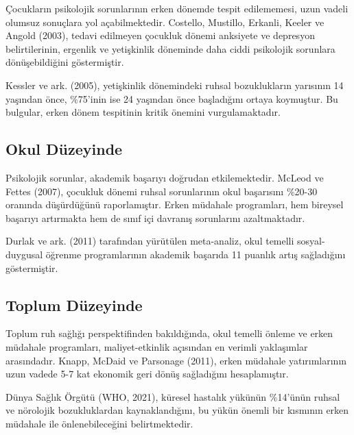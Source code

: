 Çocukların psikolojik sorunlarının erken dönemde tespit edilememesi, uzun vadeli olumsuz sonuçlara yol açabilmektedir. Costello, Mustillo, Erkanli, Keeler ve Angold (2003), tedavi edilmeyen çocukluk dönemi anksiyete ve depresyon belirtilerinin, ergenlik ve yetişkinlik döneminde daha ciddi psikolojik sorunlara dönüşebildiğini göstermiştir.

Kessler ve ark. (2005), yetişkinlik dönemindeki ruhsal bozuklukların yarısının 14 yaşından önce, \%75'inin ise 24 yaşından önce başladığını ortaya koymuştur. Bu bulgular, erken dönem tespitinin kritik önemini vurgulamaktadır.

\subsection{Okul Düzeyinde}

Psikolojik sorunlar, akademik başarıyı doğrudan etkilemektedir. McLeod ve Fettes (2007), çocukluk dönemi ruhsal sorunlarının okul başarısını \%20-30 oranında düşürdüğünü raporlamıştır. Erken müdahale programları, hem bireysel başarıyı artırmakta hem de sınıf içi davranış sorunlarını azaltmaktadır.

Durlak ve ark. (2011) tarafından yürütülen meta-analiz, okul temelli sosyal-duygusal öğrenme programlarının akademik başarıda 11 puanlık artış sağladığını göstermiştir.

\subsection{Toplum Düzeyinde}

Toplum ruh sağlığı perspektifinden bakıldığında, okul temelli önleme ve erken müdahale programları, maliyet-etkinlik açısından en verimli yaklaşımlar arasındadır. Knapp, McDaid ve Parsonage (2011), erken müdahale yatırımlarının uzun vadede 5-7 kat ekonomik geri dönüş sağladığını hesaplamıştır.

Dünya Sağlık Örgütü (WHO, 2021), küresel hastalık yükünün \%14'ünün ruhsal ve nörolojik bozukluklardan kaynaklandığını, bu yükün önemli bir kısmının erken müdahale ile önlenebileceğini belirtmektedir.

\newpage
